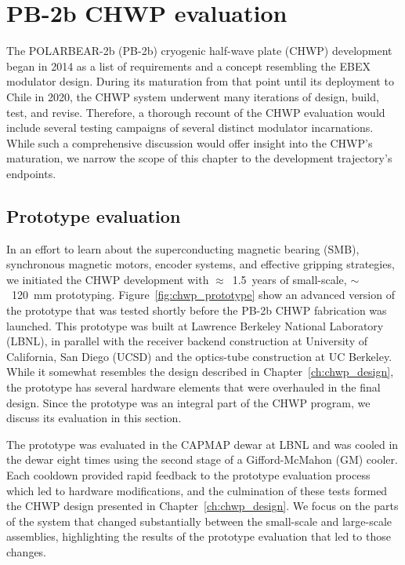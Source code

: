 \chapter[PB-2b CHWP evaluation]{PB-2b CHWP evaluation}
\label{ch:pb2b_chwp_evaluation}

The POLARBEAR-2b (PB-2b) cryogenic half-wave plate (CHWP) development began in 2014 as a list of requirements and a concept resembling the EBEX modulator design. During its maturation from that point until its deployment to Chile in 2020, the CHWP system underwent many iterations of design, build, test, and revise. Therefore, a thorough recount of the CHWP evaluation would include several testing campaigns of several distinct modulator incarnations. While such a comprehensive discussion would offer insight into the CHWP's maturation, we narrow the scope of this chapter to the development trajectory's endpoints.


\section{Prototype evaluation}
\label{sec:pb2b_chwp_prototype}

In an effort to learn about the superconducting magnetic bearing (SMB), synchronous magnetic motors, encoder systems, and effective gripping strategies, we initiated the CHWP development with $\approx$~1.5~years of small-scale, $\sim$~120~mm prototyping. Figure~\ref{fig:chwp_prototype} show an advanced version of the prototype that was tested shortly before the PB-2b CHWP fabrication was launched. This prototype was built at Lawrence Berkeley National Laboratory (LBNL), in parallel with the receiver backend construction at University of California, San Diego (UCSD) and the optics-tube construction at UC Berkeley. While it somewhat resembles the design described in Chapter~\ref{ch:chwp_design}, the prototype has several hardware elements that were overhauled in the final design. Since the prototype was an integral part of the CHWP program, we discuss its evaluation in this section.

The prototype was evaluated in the CAPMAP dewar at LBNL and was cooled in the dewar eight times using the second stage of a Gifford-McMahon (GM) cooler. Each cooldown provided rapid feedback to the prototype evaluation process which led to hardware modifications, and the culmination of these tests formed the CHWP design presented in Chapter~\ref{ch:chwp_design}. We focus on the parts of the system that changed substantially between the small-scale and large-scale assemblies, highlighting the results of the prototype evaluation that led to those changes.

